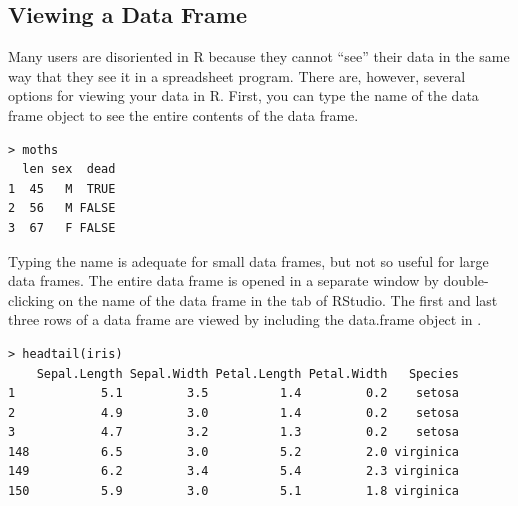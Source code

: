 \documentclass[10pt,openany]{book}\usepackage[]{graphicx}\usepackage[]{color}
\makeatletter
\newenvironment{kframe}{%
 \def\at@end@of@kframe{}%
 \ifinner\ifhmode%
  \def\at@end@of@kframe{\end{minipage}}%
  \begin{minipage}{\columnwidth}%
 \fi\fi%
 \def\FrameCommand##1{\hskip\@totalleftmargin \hskip-\fboxsep
 \colorbox{shadecolor}{##1}\hskip-\fboxsep
     \hskip-\linewidth \hskip-\@totalleftmargin \hskip\columnwidth}%
 \MakeFramed {\advance\hsize-\width
   \@totalleftmargin\z@ \linewidth\hsize
   \@setminipage}}%
 {\par\unskip\endMakeFramed%
 \at@end@of@kframe}
\newenvironment{knitrout}{}{} %
\makeatother
\begin{document}
\subsection{Viewing a Data Frame}  \label{sect:RViewdf}
Many users are disoriented in R because they cannot ``see'' their data in the same way that they see it in a spreadsheet program.  There are, however, several options for viewing your data in R.  First, you can type the name of the data frame object to see the entire contents of the data frame.
\begin{knitrout}
\color{fgcolor}\begin{kframe}
\begin{verbatim}
> moths
  len sex  dead
1  45   M  TRUE
2  56   M FALSE
3  67   F FALSE
\end{verbatim}
\end{kframe}
\end{knitrout}

Typing the name is adequate for small data frames, but not so useful for large data frames.  The entire data frame is opened in a separate window by double-clicking on the name of the data frame in the  tab of RStudio.  The first and last three rows of a data frame are viewed by including the data.frame object in .
\begin{knitrout}
\color{fgcolor}\begin{kframe}
\begin{verbatim}
> headtail(iris)
    Sepal.Length Sepal.Width Petal.Length Petal.Width   Species
1            5.1         3.5          1.4         0.2    setosa
2            4.9         3.0          1.4         0.2    setosa
3            4.7         3.2          1.3         0.2    setosa
148          6.5         3.0          5.2         2.0 virginica
149          6.2         3.4          5.4         2.3 virginica
150          5.9         3.0          5.1         1.8 virginica
\end{verbatim}
\end{kframe}
\end{knitrout}
\end{document}
